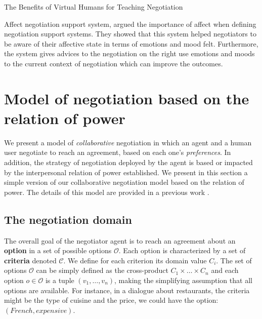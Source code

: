\documentclass[runningheads,a4paper]{llncs}
\begin{document}
			The Benefits of Virtual Humans for Teaching Negotiation
			
			
			 Affect negotiation support system, argued the importance of affect when defining negotiation support systems. They showed that this system helped negotiators to be aware of their affective state in terms of emotions and mood felt. Furthermore, the system gives advices to the negotiation on the right use emotions and moods to the current context of negotiation which can improve the outcomes.
			

	
	\section{Model of negotiation based on the relation of power}
	We present a model of \textit{collaborative} negotiation in which an agent and a human user negotiate to reach an agreement, based on each one's \textit{preferences}. In addition, the strategy of negotiation deployed by the agent is based or impacted by the interpersonal relation of power established.
	We present in this section a simple version of our collaborative negotiation model based on the relation of power. The details of this model are  provided in a previous work \cite{ouali2017computational}.
	\subsection{The negotiation domain}
	
	The overall goal of the negotiator agent is to reach an agreement about an \textbf{option} in a set of possible options $\mathcal{O}$. 
	Each option is characterized by a set of \textbf{criteria} denoted $\mathcal{C}$. We define for each criterion its domain value $C_i$.
	The set of options $\mathcal{O}$ can be simply defined as the cross-product $C_1\times\ldots\times C_n$ and each option $o\in\mathcal{O}$ is a tuple $(v_1,\ldots,v_n)$, making the simplifying assumption that all options are available. For instance, in a dialogue about restaurants, the criteria might be the type of cuisine and the price, we could have the option: $(French,expensive)$.
	
\end{document}
